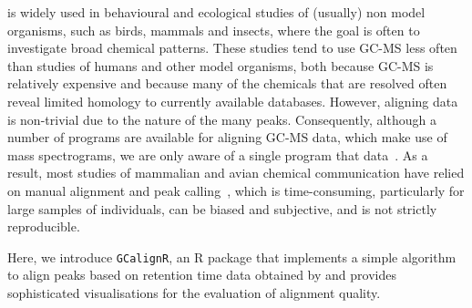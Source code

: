 \documentclass[10pt,letterpaper]{article}
\begin{document}
 is widely used in behavioural and ecological studies of (usually) non model organisms, such as birds, mammals and insects, where the goal is often to investigate broad chemical patterns. These studies tend to use GC-MS less often than studies of humans and other model organisms, both because GC-MS is relatively expensive and because many of the chemicals that are resolved often reveal limited homology to currently available databases. However, aligning  data is non-trivial due to the  nature of the many peaks. Consequently, although a number of programs are available for aligning GC-MS data, which make use of  mass spectrograms, we are only aware of a single program that  data~\cite{Dellicour.2013}.  As a result, most studies of mammalian and avian chemical communication have relied on manual alignment and peak calling~\cite{Drea.2013}, which is time-consuming, particularly for large samples of individuals, can be biased and subjective, and is not strictly reproducible. \par
Here, we introduce \texttt{GCalignR}, an R package that implements a simple algorithm to align peaks based on retention time data obtained by  and provides sophisticated visualisations for the  evaluation of alignment quality.  \par
\end{document}
